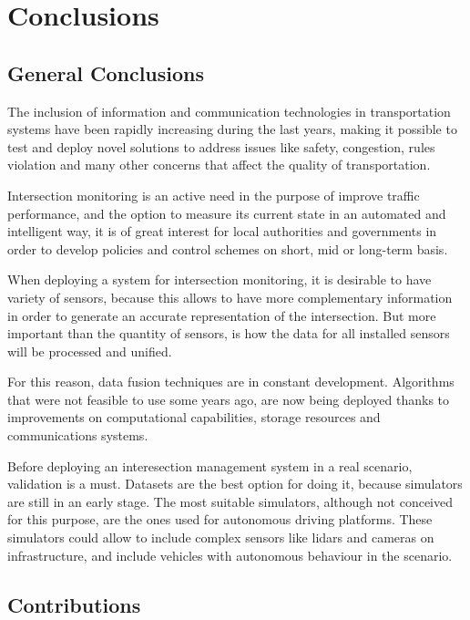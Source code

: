 \chapter {Conclusions}

\section{General Conclusions}

The inclusion of information and communication technologies in transportation systems have been rapidly increasing during the last years, making it possible to test and deploy novel solutions to address issues like safety, congestion, rules violation and many other concerns that affect the quality of transportation.

Intersection monitoring is an active need in the purpose of improve traffic performance, and the option to measure its current state in an automated and intelligent way, it is of great interest for local authorities and governments in order to develop policies and control schemes on short, mid or long-term basis.

When deploying a system for intersection monitoring, it is desirable to have variety of sensors, because this allows to have more complementary information in order to generate an accurate representation of the intersection. But more important than the quantity of sensors, is how the data for all installed sensors will be processed and unified.

For this reason, data fusion techniques are in constant development. Algorithms that were not feasible to use some years ago, are now being deployed thanks to improvements on computational capabilities, storage resources and communications systems.

Before deploying an interesection management system in a real scenario, validation is a must. Datasets are the best option for doing it, because simulators are still in an early stage. The most suitable simulators, although not conceived for this purpose, are the ones used for autonomous driving platforms. These simulators could allow to include complex sensors like lidars and cameras on infrastructure, and include vehicles with autonomous behaviour in the scenario.


\section{Contributions}

